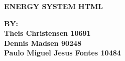 
\begin{centering}
\thispagestyle{empty} %

\begin{center}
\textbf{\Huge {ENERGY SYSTEM HTML}\\ \vspace{1cm}}
\end{center}

\centering
 \end{centering}

\begin{center}
\Large{\textbf{BY: \\Theis Christensen 10691 \\Dennis Madsen 90248\\Paulo Miguel Jesus Fontes 10484}}
\end{center}